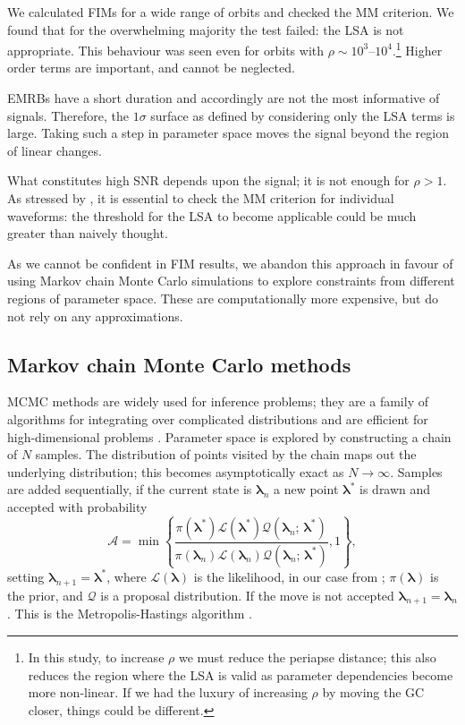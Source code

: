 We calculated FIMs for a wide range of orbits and checked the MM criterion. We found that for the overwhelming majority the test failed: the LSA is not appropriate. This behaviour was seen even for orbits with $\rho \sim 10^3$--$10^4$.\footnote{In this study, to increase $\rho$ we must reduce the periapse distance; this also reduces the region where the LSA is valid as parameter dependencies become more non-linear. If we had the luxury of increasing $\rho$ by moving the GC closer, things could be different.} Higher order terms are important, and cannot be neglected.

EMRBs have a short duration and accordingly are not the most informative of signals. Therefore, the $1\sigma$ surface as defined by considering only the LSA terms is large. Taking such a step in parameter space moves the signal beyond the region of linear changes.

What constitutes high SNR depends upon the signal; it is not enough for $\rho > 1$. As stressed by \citet{Vallisneri2008}, it is essential to check the MM criterion for individual waveforms: the threshold for the LSA to become applicable could be much greater than naively thought.

As we cannot be confident in FIM results, we abandon this approach in favour of using Markov chain Monte Carlo simulations to explore constraints from different regions of parameter space. These are computationally more expensive, but do not rely on any approximations.

\subsection{Markov chain Monte Carlo methods}\label{sec:MCMC}

MCMC methods are widely used for inference problems; they are a family of algorithms for integrating over complicated distributions and are efficient for high-dimensional problems \citep[chapter 29]{MacKay2003}. Parameter space is explored by constructing a chain of $N$ samples. The distribution of points visited by the chain maps out the underlying distribution; this becomes asymptotically exact as $N \rightarrow \infty$. Samples are added sequentially, if the current state is $\boldsymbol{\lambda}_n$ a new point $\boldsymbol{\lambda}^\ast$ is drawn and accepted with probability
\begin{equation}
\mathcal{A} = \min\left\{\dfrac{\pi(\boldsymbol{\lambda}^\ast)\mathcal{L}(\boldsymbol{\lambda}^\ast)\mathcal{Q}(\boldsymbol{\lambda}_n;\,\boldsymbol{\lambda}^\ast)}{\pi(\boldsymbol{\lambda}_n)\mathcal{L}(\boldsymbol{\lambda}_n)\mathcal{Q}(\boldsymbol{\lambda}_n;\,\boldsymbol{\lambda}^\ast)}, 1\right\},
\end{equation}
setting $\boldsymbol{\lambda}_{n + 1} = \boldsymbol{\lambda}^\ast$, where $\mathcal{L}(\boldsymbol{\lambda})$ is the likelihood, in our case from ; $\pi(\boldsymbol{\lambda})$ is the prior, and $\mathcal{Q}$ is a proposal distribution. If the move is not accepted  $\boldsymbol{\lambda}_{n + 1} = \boldsymbol{\lambda}_n$. This is the Metropolis-Hastings algorithm \citep{Metropolis1953,Hastings1970}.

